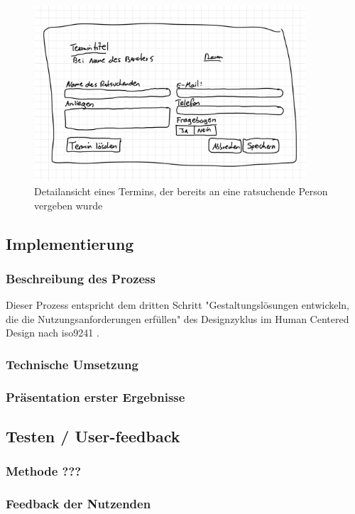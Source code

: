 \documentclass[12pt]{article}
\begin{document}
\begin{figure}[h]
    \caption{Detailansicht eines Termins, der bereits an eine ratsuchende Person vergeben wurde}
    \centering
    \includegraphics[width=0.9\textwidth]{doodle_client_details.jpeg}
\end{figure}


\subsection{Implementierung}
\subsubsection{Beschreibung des Prozess}
Dieser Prozess entspricht dem dritten Schritt "Gestaltungslösungen entwickeln, die die Nutzungsanforderungen erfüllen" des Designzyklus im Human Centered Design nach iso9241 \cite{iso9241}.

\subsubsection{Technische Umsetzung}
\subsubsection{Präsentation erster Ergebnisse}

\subsection{Testen / User-feedback}
\subsubsection{Methode ???}
\subsubsection{Feedback der Nutzenden}
\end{document}
